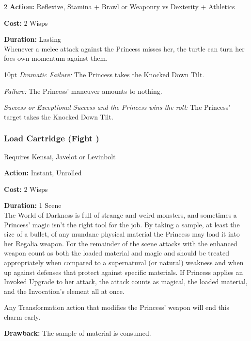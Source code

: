 \begin{multicols}{2}
\noindent \textbf{Action:} Reflexive, Stamina + Brawl or Weaponry vs Dexterity + Athletics

\noindent \textbf{Cost:} 2 Wisps

\noindent \textbf{Duration:} Lasting \\

Whenever a melee attack against the Princess misses her, the turtle can turn her foes own momentum against them. 

\begin{myindentpar}{10pt} 
\emph{Dramatic Failure:}  The Princess takes the Knocked Down Tilt.

\emph{Failure:} The Princess' maneuver amounts to nothing. 

\emph{Success or Exceptional Success and the Princess wins the roll:}  The Princess' target takes the Knocked Down Tilt.\end{myindentpar}


\subsubsection*{Load Cartridge (Fight \textbullet\textbullet\textbullet)}
\noindent Requires Kensai, Javelot or Levinbolt

\noindent \textbf{Action:} Instant, Unrolled

\noindent \textbf{Cost:} 2 Wisps

\noindent \textbf{Duration:} 1 Scene \\

The World of Darkness is full of strange and weird monsters, and sometimes a Princess' magic isn't the right tool for the job. By taking a sample, at least the size of a bullet, of any mundane physical material the Princess may load it into her Regalia weapon. For the remainder of the scene attacks with the enhanced weapon count as both the loaded material and magic and should be treated appropriately when compared to a supernatural (or natural) weakness and when up against defenses that protect against specific materials. If Princess applies an Invoked Upgrade to her attack, the attack counts as magical, the loaded material, and the Invocation's element all at once. 

Any Transformation action that modifies the Princess' weapon will end this charm early. 

\textbf{Drawback:} The sample of material is consumed.



\end{multicols}
